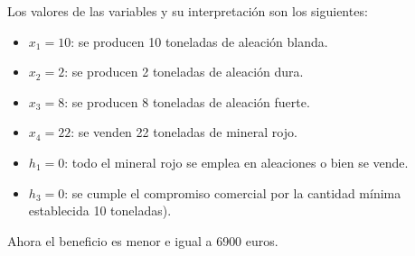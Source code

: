 \begin{enumerate}
Los valores de las variables y su interpretación son los siguientes:
\begin{itemize}
    \item $x_1 = 10$: se producen 10 toneladas de aleación blanda. 
    \item $x_2 = 2$: se producen 2 toneladas de aleación dura.
    \item $x_3 = 8$: se producen 8 toneladas de aleación fuerte.
    \item $x_4 = 22$: se venden 22 toneladas de mineral rojo.
    \item $h_1 = 0$: todo el mineral rojo se emplea en aleaciones o bien se vende.
    \item $h_3 = 0$: se cumple el compromiso comercial por la cantidad mínima establecida 10 toneladas).
\end{itemize}

Ahora el beneficio es menor e igual a 6900 euros.


\end{enumerate}